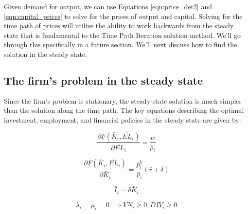 \documentclass[letterpaper,12pt]{article}
\theoremstyle{definition}
\begin{document}
\begin{spacing}{1.5}
%


Given demand for output, we can use Equations \ref{eqn:price_det2} and \ref{eqn:capital_prices} to solve for the prices of output and capital.  Solving for the time path of prices will utilize the ability to work backwards from the steady state that is fundamental to the Time Path Iteration solution method.  We'll go through this specifically in a future section.  We'll next discuss how to find the solution in the steady state.

\subsection*{The firm's problem in the steady state}	

Since the firm's problem is stationary, the steady-state solution is much simpler than the solution along the time path. The key equations describing the optimal investment, employment, and financial policies in the steady state are given by:

\begin{equation}
\label{eqn:foc_l_ss}
\frac{\partial F(\bar{K}_{i},\overline{EL}_{i})}{\partial \overline{EL}_{i}} = \frac{\bar{w}}{\bar{p}_{i}}
\end{equation}

\begin{equation}
\label{eqn:foc_k_ss}
\frac{\partial F(\bar{K}_{i},\overline{EL}_{i})}{\partial \bar{K}_{i}} = \frac{\bar{p}^{k}_{i}}{\bar{p}_{i}}(\bar{r}+\delta)
\end{equation}

\begin{equation}
\label{eqn:i_ss}
\bar{I}_{i} = \delta \bar{K}_{i}
\end{equation}

\begin{equation}
\label{eqn:foc_vn_ss}
\bar{\lambda}_{i}=\bar{\mu}_{i} = 0 \implies \overline{VN}_{i}\geq0, \overline{DIV}_{i}\geq0
\end{equation}


\end{spacing}
\end{document}
